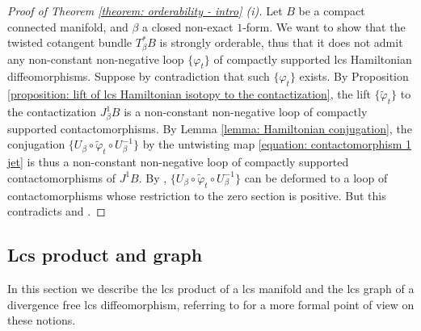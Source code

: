 \documentclass{amsart}
\theoremstyle{remark}
\begin{document}
\begin{proof}[Proof of Theorem \ref{theorem: orderability - intro} (i)]
Let $B$ be a compact connected manifold,
and $\beta$ a closed non-exact $1$-form.
We want to show that the twisted cotangent bundle $T_{\beta}^{\ast}B$
is strongly orderable,
thus that it does not admit any
non-constant non-negative loop $\{\varphi_t\}$
of compactly supported lcs Hamiltonian diffeomorphisms.
Suppose by contradiction that such $\{\varphi_t\}$ exists.
By Proposition \ref{proposition: lift of lcs Hamiltonian isotopy to the contactization},
the lift $\{\widetilde{\varphi}_t\}$ to the contactization $J^1_{\beta}B$
is a non-constant non-negative loop of compactly supported contactomorphisms.
By Lemma \ref{lemma: Hamiltonian conjugation},
the conjugation $\{U_{\beta} \circ \widetilde{\varphi}_t \circ U_{\beta}^{-1}\}$
by the untwisting map \eqref{equation: contactomorphism 1 jet}
is thus a non-constant non-negative loop
of compactly supported contactomorphisms of $J^1B$.
By \cite[Proposition 2.12]{FPR},
$\{U_{\beta} \circ \widetilde{\varphi}_t \circ U_{\beta}^{-1}\}$
can be deformed to a loop of contactomorphisms
whose restriction to the zero section is positive.
But this contradicts \cite[Theorem 1]{CFP}
and \cite[Corollary 5.5]{CN}.
\end{proof}



\subsection{Lcs product and graph}\label{section: lcs product}

In this section we describe the lcs product
of a lcs manifold
and the lcs graph of a divergence free lcs diffeomorphism,
referring to \cite{CS}
for a more formal point of view on these notions.
\end{document}
